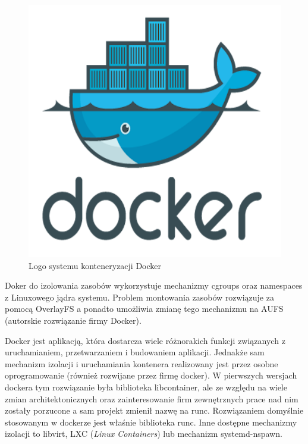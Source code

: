 \documentclass[10pt,a4paper,titlepage,twoside]{report}
\begin{document}
\begin{figure}[ht!]
	\centering
	\includegraphics[scale=0.7]{pics/docker.png}
	\caption{Logo systemu konteneryzacji Docker}
	\label{docker_logo}
\end{figure}

Doker do izolowania zasobów wykorzystuje mechanizmy cgroups oraz namespaces z Linuxowego jądra systemu. Problem montowania zasobów rozwiązuje za pomocą OverlayFS a ponadto umożliwia zmianę tego mechanizmu na AUFS (autorskie rozwiązanie firmy Docker).

Docker jest aplikacją, która dostarcza wiele różnorakich funkcji związanych z uruchamianiem, przetwarzaniem i budowaniem aplikacji. Jednakże sam mechanizm izolacji i uruchamiania kontenera realizowany jest przez osobne oprogramowanie (również rozwijane przez firmę docker). W pierwszych wersjach dockera tym rozwiązanie była biblioteka libcontainer, ale ze względu na wiele zmian architektonicznych oraz zainteresowanie firm zewnętrznych prace nad nim zostały porzucone a sam projekt zmienił nazwę na runc. Rozwiązaniem domyślnie stosowanym w dockerze jest właśnie biblioteka runc. Inne dostępne mechanizmy izolacji to libvirt, LXC (\textit{Linux Containers}) lub mechanizm systemd-nspawn.
\end{document}
